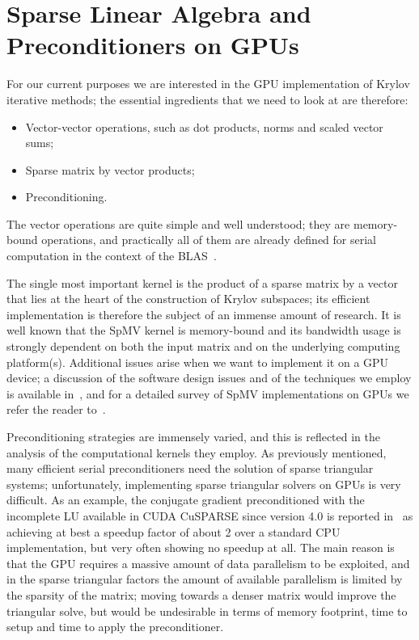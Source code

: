 \section{Sparse Linear Algebra and Preconditioners on GPUs\label{SLA-GPU}}

For our current purposes we are interested in the GPU implementation
of Krylov iterative methods; the essential ingredients that we need to 
look at are therefore:
\begin{itemize}
\item Vector-vector operations, such as dot products, norms and scaled
  vector sums;
\item Sparse matrix by vector products;
\item Preconditioning.
\end{itemize}
The vector operations are quite simple and well understood; they are
memory-bound operations, and practically all  of them are already
defined for serial computation in the context of the
BLAS~\cite{BLAS1,BLAS3}.  

The single most important kernel is the product of a sparse matrix by
a vector that lies at the heart of the construction of Krylov
subspaces; its efficient implementation is therefore the subject of an
immense amount of research. It is well known that the SpMV kernel is
memory-bound and  its bandwidth usage  is strongly dependent on both
the input matrix and on the underlying computing
platform(s). Additional issues arise when we want to implement it on a
GPU device; a discussion of the software design issues and of the
techniques we employ is available in~\cite{CaFiRo:2014,PSBLAS3}, and
for a detailed survey of SpMV implementations on GPUs 
we refer the reader to~\cite{Filippone:2017:SMM:3034774.3017994}. 

Preconditioning strategies are immensely varied, and this is reflected
in the analysis of the computational kernels they employ. 
As previously mentioned, many efficient serial preconditioners need the
solution of sparse triangular systems; unfortunately, implementing
sparse triangular solvers   on GPUs is very difficult.
As an example, the conjugate gradient preconditioned with the incomplete
LU available in CUDA CuSPARSE since version 4.0 
is reported in~\cite{Naumov11} as achieving at best a speedup factor
of about 2 over a standard CPU implementation, but very often showing
no speedup at all. The main reason is that the GPU requires a massive
amount of data parallelism to be exploited,  and in the sparse
triangular factors the amount of available parallelism is limited by
the sparsity of the matrix; moving towards a denser matrix would
improve the triangular solve, but would be  undesirable in terms of
memory footprint, time to setup and time to apply the preconditioner.    

